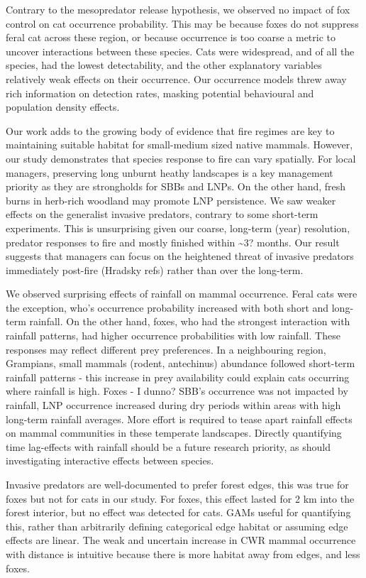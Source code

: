 \documentclass[11pt,a4paper,titlepage,twoside,openright]{style/unimelbthesis}
\begin{document}
\begin{mainmatter}
Contrary to the mesopredator release hypothesis, we observed no impact of fox control on cat occurrence probability. This may be because foxes do not suppress feral cat across these region, or because occurrence is too coarse a metric to uncover interactions between these species. Cats were widespread, and of all the species, had the lowest detectability, and the other explanatory variables relatively weak effects on their occurrence. Our occurrence models threw away rich information on detection rates, masking potential behavioural and population density effects.

Our work adds to the growing body of evidence that fire regimes are key to maintaining suitable habitat for small-medium sized native mammals. However, our study demonstrates that species response to fire can vary spatially. For local managers, preserving long unburnt heathy landscapes is a key management priority as they are strongholds for SBBs and LNPs. On the other hand, fresh burns in herb-rich woodland may promote LNP persistence. We saw weaker effects on the generalist invasive predators, contrary to some short-term experiments. This is unsurprising given our coarse, long-term (year) resolution, predator responses to fire and mostly finished within \textasciitilde3? months. Our result suggests that managers can focus on the heightened threat of invasive predators immediately post-fire (Hradsky refs) rather than over the long-term.

We observed surprising effects of rainfall on mammal occurrence. Feral cats were the exception, who's occurrence probability increased with both short and long-term rainfall. On the other hand, foxes, who had the strongest interaction with rainfall patterns, had higher occurrence probabilities with low rainfall. These responses may reflect different prey preferences. In a neighbouring region, Grampians, small mammals (rodent, antechinus) abundance followed short-term rainfall patterns - this increase in prey availability could explain cats occurring where rainfall is high. Foxes - I dunno? SBB's occurrence was not impacted by rainfall, LNP occurrence increased during dry periods within areas with high long-term rainfall averages. More effort is required to tease apart rainfall effects on mammal communities in these temperate landscapes. Directly quantifying time lag-effects with rainfall should be a future research priority, as should investigating interactive effects between species.

Invasive predators are well-documented to prefer forest edges, this was true for foxes but not for cats in our study.
For foxes, this effect lasted for 2 km into the forest interior, but no effect was detected for cats. GAMs useful for quantifying this, rather than arbitrarily defining categorical edge habitat or assuming edge effects are linear. The weak and uncertain increase in CWR mammal occurrence with distance is intuitive because there is more habitat away from edges, and less foxes.


\end{mainmatter}
\end{document}
